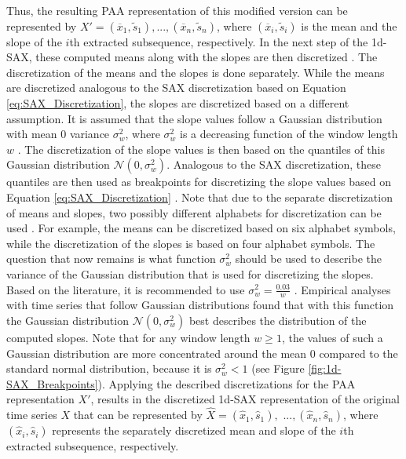 Thus, the resulting \ac{PAA} representation of this modified version can be represented by $X' = (\overline{x}_1, \tilde{s}_1), ..., (\overline{x}_n, \tilde{s}_n)$, where $(\overline{x}_i, \tilde{s}_i)$ is the mean and the slope of the $i$th extracted subsequence, respectively. \newline
In the next step of the \ac{1d-SAX}, these computed means along with the slopes are then discretized \cite{1d-SAX}. The discretization of the means and the slopes is done separately. While the means are discretized analogous to the \ac{SAX} discretization based on Equation \ref{eq:SAX_Discretization}, the slopes are discretized based on a different assumption. \newline
It is assumed that the slope values follow a Gaussian distribution with mean 0 variance $\sigma^{2}_w$, where $\sigma^{2}_w$ is a decreasing function of the window length $w$ \cite{1d-SAX}. The discretization of the slope values is then based on the quantiles of this Gaussian distribution $\mathcal{N}(0,\sigma^{2}_w)$. Analogous to the \ac{SAX} discretization, these quantiles are then used as breakpoints for discretizing the slope values based on Equation \ref{eq:SAX_Discretization} \cite{1d-SAX}. Note that due to the separate discretization of means and slopes, two possibly different alphabets for discretization can be used \cite{1d-SAX}. For example, the means can be discretized based on six alphabet symbols, while the discretization of the slopes is based on four alphabet symbols. \newline
The question that now remains is what function $\sigma^{2}_w$ should be used to describe the variance of the Gaussian distribution that is used for discretizing the slopes. Based on the literature, it is recommended to use $\sigma^{2}_w = \frac{0.03}{w}$ \cite{1d-SAX}. Empirical analyses with time series that follow Gaussian distributions found that with this function the Gaussian distribution $\mathcal{N}(0,\sigma^{2}_w)$ best describes the distribution of the computed slopes. Note that for any window length $w \geq 1$, the values of such a Gaussian distribution are more concentrated around the mean $0$ compared to the standard normal distribution, because it is $\sigma^{2}_w < 1$ (see Figure \ref{fig:1d-SAX_Breakpoints}). \newline
Applying the described discretizations for the \ac{PAA} representation $X'$, results in the discretized \ac{1d-SAX} representation of the original time series $X$ that can be represented by $\hat{X} = (\hat{x}_1, \hat{s}_1),$ $..., (\hat{x}_n, \hat{s}_n)$, where $(\hat{x}_i, \hat{s}_i)$ represents the separately discretized mean and slope of the $i$th extracted subsequence, respectively. \newline
